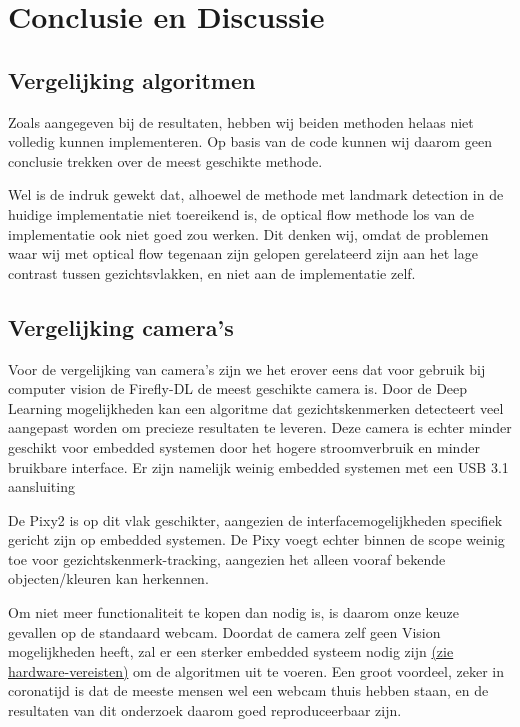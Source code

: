 \documentclass[11pt]{article}
\begin{document}
    \section{Conclusie en Discussie}\label{sec:conclusie-en-discussie}

    \subsection{Vergelijking algoritmen}
    Zoals aangegeven bij de resultaten, hebben wij beiden methoden helaas niet volledig kunnen implementeren.
    Op basis van de code kunnen wij daarom geen conclusie trekken over de meest geschikte methode.

    Wel is de indruk gewekt dat, alhoewel de methode met landmark detection in de huidige implementatie niet toereikend is,
    de optical flow methode los van de implementatie ook niet goed zou werken. Dit denken wij, omdat de problemen waar wij met optical
    flow tegenaan zijn gelopen gerelateerd zijn aan het lage contrast tussen gezichtsvlakken, en niet aan de implementatie zelf.


    \subsection{Vergelijking camera's}
    Voor de vergelijking van camera's zijn we het erover eens dat voor gebruik bij computer vision de Firefly-DL de meest geschikte camera is.
    Door de Deep Learning mogelijkheden kan een algoritme dat gezichtskenmerken detecteert veel aangepast worden om precieze resultaten te leveren.
    Deze camera is echter minder geschikt voor embedded systemen door het hogere stroomverbruik en minder bruikbare interface.
    Er zijn namelijk weinig embedded systemen met een USB 3.1 aansluiting\footnotemark[3]


    De Pixy2 is op dit vlak geschikter, aangezien de interfacemogelijkheden specifiek gericht zijn op embedded systemen.
    De Pixy voegt echter binnen de scope weinig toe voor gezichtskenmerk-tracking, aangezien het alleen vooraf bekende objecten/kleuren kan herkennen.

    Om niet meer functionaliteit te kopen dan nodig is, is daarom onze keuze gevallen op de standaard webcam.
    Doordat de camera zelf geen Vision mogelijkheden heeft, zal er een sterker embedded systeem nodig zijn \hyperref[meth1-hardware]{(zie hardware-vereisten)} om de algoritmen uit te voeren.
    Een groot voordeel, zeker in coronatijd is dat de meeste mensen wel een webcam thuis hebben staan, en de resultaten van dit onderzoek daarom goed reproduceerbaar zijn.
\end{document}
